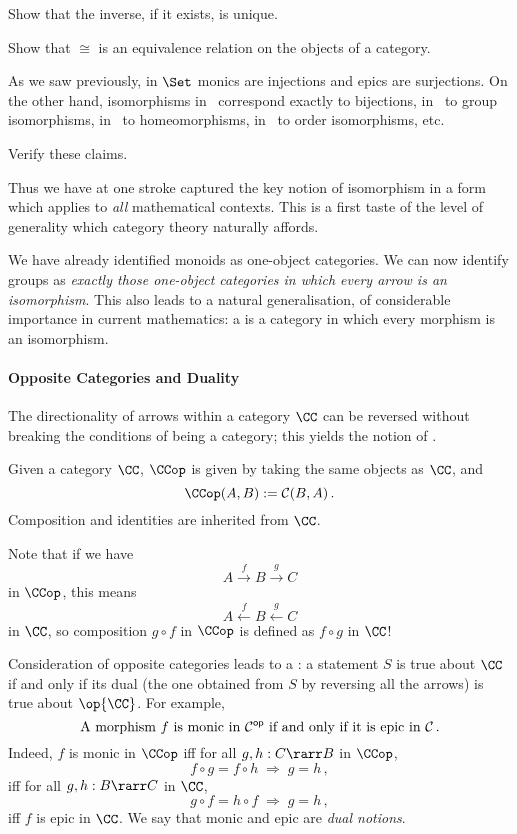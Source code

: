 \documentclass[12pt]{article}
\begin{document}
\begin{myexercise}
Show that the inverse, if it exists, is unique.
\end{myexercise}
\begin{myexercise}
Show that $\cong$ is an equivalence relation on the objects of a category.
\end{myexercise}
As we saw previously, in $\Set$ monics are injections and epics are surjections. On the other hand, isomorphisms in \Set\ correspond exactly to bijections, in \Grp\
to group isomorphisms, in \Top\ to homeomorphisms, in \Pos\ to order isomorphisms, etc.
\begin{myexercise}
Verify these claims.
\end{myexercise}
Thus we have at one stroke captured the key notion of isomorphism in a form which applies
to \emph{all} mathematical contexts. This is a first taste of the level of generality which category theory naturally affords.

We have already identified monoids as one-object categories. We can now identify groups as \emph{exactly those one-object categories in which every arrow is an isomorphism}. This also leads to a natural generalisation, of considerable importance in current mathematics: a  is a category in which every morphism is an isomorphism.

\paragraph{Opposite Categories and Duality}
The directionality of arrows within a category $\CC$ can be reversed without breaking the conditions of being a category; this yields the notion of .

\begin{mydefinition}
Given a category $\CC$,  $\CCop$ is given by taking the same objects as $\CC$, and
\[ \CCop(A, B) := \mathcal{C}(B, A)\,. \]
Composition and identities are inherited from $\CC$. \deq
\end{mydefinition}
%
Note that if we have
\[ A \stackrel{f}{\longrightarrow} B \stackrel{g}{\longrightarrow} C
\]
in $\CCop$, this means
\[ A \stackrel{f}{\longleftarrow} B \stackrel{g}{\longleftarrow} C \]
in $\CC$, so composition  $g \circ f$ in $\CCop$ is defined as $f \circ g$ in $\CC$!

Consideration of opposite categories leads to a : a statement $S$ is true about $\CC$ if and only if its dual (\ie the one
obtained from $S$ by reversing all the arrows) is true about $\op{\CC}$. For example,
\[ \text{A morphism $f$ is {monic} in $\mathcal{C}^{\mathsf{op}}$ if and only if it is {epic} in $\mathcal{C}$\,.} \]
Indeed, $f$ is monic in $\CCop$ iff for all $g, h : C \rarr B$ in $\CCop$,
\[ f \circ g = f \circ h \; \Longrightarrow \; g = h\,, \]
iff for all $g, h : B \rarr C$ in $\CC$,
\[ g \circ f = h \circ f \; \Longrightarrow \; g = h\,, \]
iff $f$ is epic in $\CC$. We say that monic and epic are \emph{dual notions}.
\end{document}
